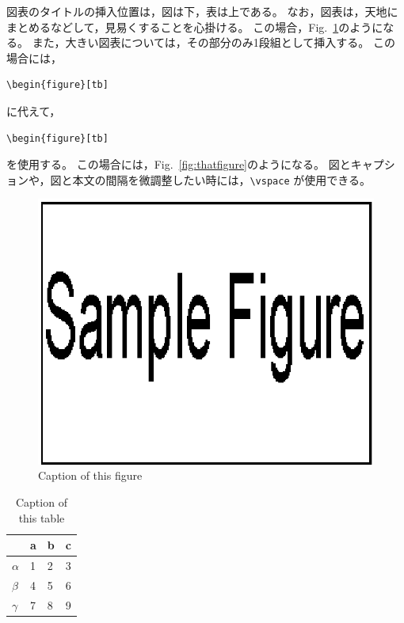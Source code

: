 \documentclass[10pt,twocolumn]{jarticle} %
\begin{document}
図表のタイトルの挿入位置は，図は下，表は上である。
なお，図表は，天地にまとめるなどして，見易くすることを心掛ける。
この場合，Fig.~\ref{fig:thisfigure}のようになる。
また，大きい図表については，その部分のみ1段組として挿入する。
この場合には，
\begin{verbatim}
\begin{figure}[tb]
\end{verbatim}
に代えて，
\begin{verbatim}
\begin{figure}[tb]
\end{verbatim}
を使用する。
この場合には，Fig.~\ref{fig:thatfigure}のようになる。
図とキャプションや，図と本文の間隔を微調整したい時には，\verb|\vspace|
が使用できる。
%
\begin{figure}[tb]
\begin{center}
\includegraphics[width=0.8\columnwidth]{sample.eps}
\vspace{-10pt}     %
\end{center}
\caption{Caption of this figure}
\label{fig:thisfigure}
\end{figure}
%
%
\begin{table}
\caption{Caption of this table}
\label{tbl:thistable}
\begin{center}
\begin{tabular}{|l|lll|}\hline
& a & b & c\\\hline
$\alpha$ & 1 & 2 & 3\\
$\beta$ & 4 & 5 & 6\\
$\gamma$ & 7 & 8 & 9\\\hline
\end{tabular}
\vspace{-10pt}   %
\end{center}
\end{table}
\end{document}
